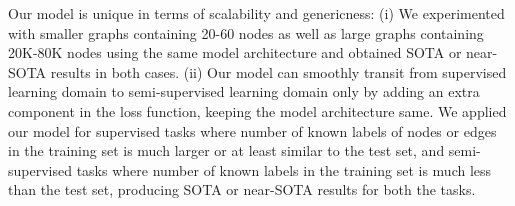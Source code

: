 Our model is unique in terms of scalability and genericness:
(i) We experimented with smaller graphs containing 20-60 nodes as well as large graphs containing 20K-80K nodes using the same model architecture and obtained SOTA or near-SOTA results in both cases.
(ii) Our model can smoothly transit from supervised learning domain to semi-supervised learning domain only by adding an extra component in the loss function, keeping the model architecture same. We applied our model for supervised tasks where number of known labels of nodes or edges in the training set is much larger or at least similar to the test set, and semi-supervised tasks where number of known labels in the training set is much less than the test set, producing SOTA or near-SOTA results for both the tasks.
